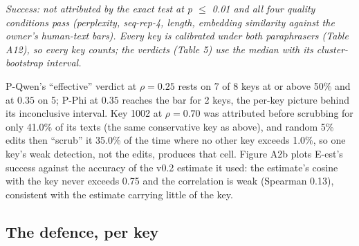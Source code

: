 \documentclass[11pt,letterpaper]{article}
\begin{document}
\emph{Success: not attributed by the exact test at p \ensuremath{\leq} 0.01 and all four quality conditions pass (perplexity, seq-rep-4, length, embedding similarity against the owner's human-text bars). Every key is calibrated under both paraphrasers (Table A12), so every key counts; the verdicts (Table 5) use the median with its cluster-bootstrap interval.}

P-Qwen's ``effective'' verdict at \(\rho = 0.25\) rests on 7 of 8 keys at or above 50\% and at \(0.35\) on 5; P-Phi at \(0.35\) reaches the bar for 2 keys, the per-key picture behind its inconclusive interval. Key 1002 at \(\rho = 0.70\) was attributed before scrubbing for only 41.0\% of its texts (the same conservative key as above), and random 5\% edits then ``scrub'' it 35.0\% of the time where no other key exceeds 1.0\%, so one key's weak detection, not the edits, produces that cell. Figure A2b plots E-est's success against the accuracy of the v0.2 estimate it used: the estimate's cosine with the key never exceeds 0.75 and the correlation is weak (Spearman 0.13), consistent with the estimate carrying little of the key.

\hypertarget{the-defence-per-key}{%
\subsection{The defence, per key}\label{the-defence-per-key}}
\end{document}
